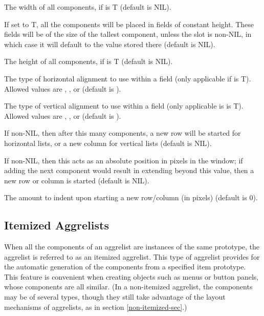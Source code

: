 \begin{description}
\item[]  \value{shortdash} The width of all components,
if  is T (default is NIL).

\item[]  \value{shortdash} If set to T, all the components
will be placed in fields of constant height.  These fields will be of
the size of the tallest component, unless the slot
 is non-NIL, in which case it will default to
the value stored there (default is NIL).

\item[]  \value{shortdash} The height of all components, if
 is T (default is NIL).

\item[]  \value{shortdash} The type of horizontal alignment to use within
a field (only applicable if  is T).  Allowed values are
 , , or  (default is ).

\item[]  \value{shortdash} The type of vertical alignment to use within
a field (only applicable is  is T).  Allowed values are
 , , or  (default is ).

\item[]  \value{shortdash} If non-NIL, then after this many
components, a new row will be started for horizontal lists, or a new
column for vertical lists (default is NIL).

\item[]  \value{shortdash} If non-NIL, then this acts as an
absolute position in pixels in the window; if adding the next component would
result in extending beyond this value, then a new row or column is started
(default is NIL).

\item[]  \value{shortdash} The amount to indent upon starting a new row/column (in pixels)
(default is 0).
\end{description}


\subsection{Itemized Aggrelists}
When all the components of an aggrelist are instances of the same prototype,
the aggrelist is referred to as an itemized aggrelist.  This type of
aggrelist provides for the automatic generation of the components from a
specified item prototype.  This feature is convenient when creating objects
such as menus or button panels, whose components are all similar.
(In a non-itemized aggrelist, the components may be of several types,
though they still take advantage of the layout mechanisms of
aggrelists, as in section \ref{non-itemized-sec}.)


